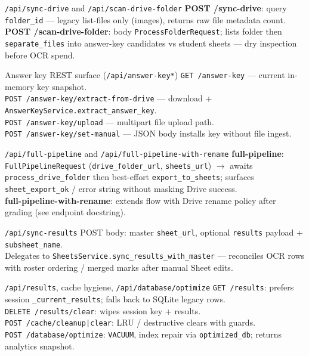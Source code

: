 \documentclass[aspectratio=169]{beamer}
\begin{document}
\begin{frame}{\texttt{/api/sync-drive} and \texttt{/api/scan-drive-folder}}
  \small
  \textbf{POST /sync-drive}: query \texttt{folder\_id} --- legacy list-files only (images), returns raw file metadata count.\\
  \textbf{POST /scan-drive-folder}: body \texttt{ProcessFolderRequest}; lists folder then \texttt{separate\_files} into answer-key candidates vs student sheets --- dry inspection before OCR spend.
\end{frame}

\begin{frame}{Answer key REST surface (\texttt{/api/answer-key*})}
  \tiny
  \texttt{GET /answer-key} --- current in-memory key snapshot.\\
  \texttt{POST /answer-key/extract-from-drive} --- download + \texttt{AnswerKeyService.extract\_answer\_key}.\\
  \texttt{POST /answer-key/upload} --- multipart file upload path.\\
  \texttt{POST /answer-key/set-manual} --- JSON body installs key without file ingest.
\end{frame}

\begin{frame}{\texttt{/api/full-pipeline} and \texttt{/api/full-pipeline-with-rename}}
  \small
  \textbf{full-pipeline}: \texttt{FullPipelineRequest} (\texttt{drive\_folder\_url}, \texttt{sheets\_url}) $\rightarrow$ awaits \texttt{process\_drive\_folder} then best-effort \texttt{export\_to\_sheets}; surfaces \texttt{sheet\_export\_ok} / error string without masking Drive success.\\
  \textbf{full-pipeline-with-rename}: extends flow with Drive rename policy after grading (see endpoint docstring).
\end{frame}

\begin{frame}{\texttt{/api/sync-results}}
  \small
  POST body: master \texttt{sheet\_url}, optional \texttt{results} payload + \texttt{subsheet\_name}.\\
  Delegates to \texttt{SheetsService.sync\_results\_with\_master} --- reconciles OCR rows with roster ordering / merged marks after manual Sheet edits.
\end{frame}

\begin{frame}{\texttt{/api/results}, cache hygiene, \texttt{/api/database/optimize}}
  \tiny
  \texttt{GET /results}: prefers session \texttt{\_current\_results}; falls back to SQLite legacy rows.\\
  \texttt{DELETE /results/clear}: wipes session key + results.\\
  \texttt{POST /cache/cleanup|clear}: LRU / destructive clears with guards.\\
  \texttt{POST /database/optimize}: \texttt{VACUUM}, index repair via \texttt{optimized\_db}; returns analytics snapshot.
\end{frame}
\end{document}
